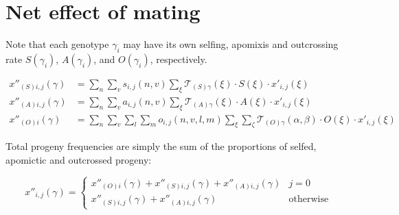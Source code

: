 \documentclass[12pt,twoside,letterpaper,fleqn]{report}
\numberwithin{equation}{section}  %
\newcommand{\K}{{\bf K}}
\newcommand{\Kcode}[1]{{\tt #1}}
\newcommand{\xpijx}{\mbox{$x'_{i,j}(\xi)$}}
\newcommand{\xppsijg}{\mbox{$x''_{(S)i,j}(\gamma)$}}
\newcommand{\xppaijg}{\mbox{$x''_{(A)i,j}(\gamma)$}}
\newcommand{\xppoig}{\mbox{$x''_{(O)i}(\gamma)$}}
\newcommand{\xppoijg}{\xppoig}
\newcommand{\xppijg}{\mbox{$x''_{i,j}(\gamma)$}}
\newcommand{\funcself}{\mbox{$s_{i,j}(n,v)$}}
\newcommand{\funcapomixis}{\mbox{$a_{i,j}(n,v)$}}
\newcommand{\funcoutcross}{\mbox{$o_{i,j}(n,v,l,m)$}}
\newcommand{\TSgx}{\mbox{$\mathcal{T}_{(S)\gamma}(\xi)$}}
\newcommand{\TAgx}{\mbox{$\mathcal{T}_{(A)\gamma}(\xi)$}}
\newcommand{\TOgab}{\mbox{$\mathcal{T}_{(O)\gamma}(\alpha, \beta)$}}
\begin{document}
{%
\section{Net effect of mating}

Note that each genotype $\gamma_i$ may have its own selfing, apomixis and
outcrossing rate $S(\gamma_i)$, $A(\gamma_i)$, and $O(\gamma_i)$, respectively.

\begin{align}
\label{eq:Kreproduction:xppsijg}
\xppsijg &= 
    \sum_{n}{
		\sum_{v}{
		    \funcself \sum_{\xi}{\TSgx \cdot S(\xi) \cdot \xpijx}
		}
	}
\\
\label{eq:Kreproduction:xppaijg}
\xppaijg &= 
    \sum_{n}{
		\sum_{v}{
			\funcapomixis \sum_{\xi}{\TAgx \cdot A(\xi) \cdot \xpijx}
		}
	}
\\
\label{eq:Kreproduction:xppoijg}
\xppoijg &= 
    \sum_{n}{
		\sum_{v}{
			\sum_{l}{
				\sum_{m}{
					\funcoutcross 
					\sum_{\xi}{\sum_{\zeta}{\TOgab \cdot O(\xi) \cdot \xpijx}}
				}
			}
		}
	}
\end{align}

Total progeny frequencies are simply the sum of the proportions of selfed,
apomictic and outcrossed progeny:

\begin{equation}
\xppijg = 
\begin{cases}
    \xppoig + \xppsijg + \xppaijg  &  j=0               \\
    \xppsijg + \xppaijg            &  \text{otherwise}
\end{cases}
\end{equation}


}
\end{document}
